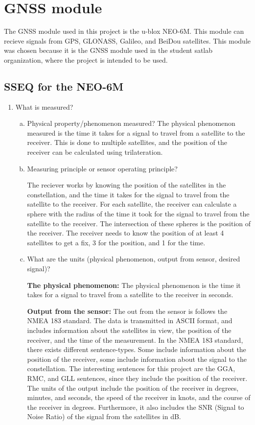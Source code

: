 \section{GNSS module}\label{sec:gnss-module}
The GNSS module used in this project is the u-blox NEO-6M.
This module can recieve signals from GPS, GLONASS, Galileo, and BeiDou satellites.
This module was chosen because it is the GNSS module used in the student satlab organization, where the project is intended to be used.

\subsection{SSEQ for the NEO-6M}
\begin{enumerate}
    \item What is measured?
    \begin{enumerate}[(a)]
        \item Physical property/phenomenon measured?
        The physical phenomenon measured is the time it takes for a signal to travel from a satellite to the receiver.
        This is done to multiple satellites, and the position of the receiver can be calculated using trilateration.

        \item Measuring principle or sensor operating principle?

        The reciever works by knowing the position of the satellites in the constellation, and the time it takes for the signal to travel from the satellite to the receiver.
        For each satellite, the receiver can calculate a sphere with the radius of the time it took for the signal to travel from the satellite to the receiver.
        The intersection of these spheres is the position of the receiver.
        The receiver needs to know the position of at least 4 satellites to get a fix, 3 for the position, and 1 for the time.


        \item What are the units (physical phenomenon, output from sensor, desired signal)?

        \textbf{The physical phenomenon:}
        The physical phenomenon is the time it takes for a signal to travel from a satellite to the receiver in seconds.

        \textbf{Output from the sensor:}
        The out from the sensor is follows the NMEA 183 standard.
        The data is transmitted in ASCII format, and includes information about the satellites in view, the position of the receiver, and the time of the measurement.
        In the NMEA 183 standard, there exists different sentence-types.
        Some include information about the position of the receiver, some include information about the signal to the constellation.
        The interesting sentences for this project are the GGA, RMC, and GLL sentences, since they include the position of the receiver.
        The units of the output include the position of the receiver in degrees, minutes, and seconds, the speed of the receiver in knots, and the course of the receiver in degrees.
        Furthermore, it also includes the SNR (Signal to Noise Ratio) of the signal from the satellites in dB.



\end{enumerate}
\end{enumerate}
